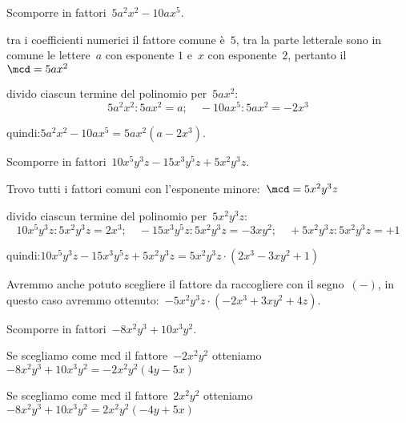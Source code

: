  \begin{esempio}
Scomporre in fattori~\(5a^{2}x^{2}-10ax^{5}\).
  \begin{enumeratea}
  \item tra i coefficienti numerici il fattore comune è~\(5\), 
   tra la parte letterale sono in comune le lettere~\(a\) con esponente \(1\) 
   e~\(x\) con esponente~\(2\), pertanto il~\(\mcd=5ax^{2}\)
 \item divido ciascun termine del polinomio per~\(5ax^{2}\):
 \[5a^{2}x^{2}:5ax^{2}=a; \quad -10ax^{5}:5ax^{2}=-2x^{3}\]
  \item quindi:\quad \(5a^{2}x^{2}-10ax^{5}=5ax^{2}(a-2x^{3})\).
  \end{enumeratea}
 \end{esempio}

 \begin{esempio}
Scomporre in fattori~\(10x^{5}y^{3}z-15x^{3}y^{5}z+5x^{2}y^{3}z\).
 \begin{enumeratea}
 \item Trovo tutti i fattori comuni con l'esponente 
minore:~\(\mcd=5x^{2}y^{3}z\)
 \item divido ciascun termine del polinomio per~\(5x^{2}y^{3}z\):
\[10x^{5}y^{3}z:5x^{2}y^{3}z=2x^{3}; \quad
-15x^{3}y^{5}z:5x^{2}y^{3}z=-3xy^{2}; \quad
+5x^{2}y^{3}z:5x^{2}y^{3}z=+1\]
 \item quindi:\quad \(10x^{5}y^{3}z-15x^{3}y^{5}z+5x^{2}y^{3}z =
 5x^{2}y^{3}z \cdot (2x^{3}-3xy^{2}+1)\)
 \end{enumeratea}
 \end{esempio}

 
\osservazione Avremmo anche potuto scegliere il fattore da raccogliere 
 con il segno~\((-)\), in questo caso avremmo 
 ottenuto:~\(-5x^{2}y^{3}z\cdot (-2x^{3}+3xy^{2}+4z)\).
 
 \begin{esempio}
Scomporre in fattori~\(-8x^{2}y^{3}+10x^{3}y^{2}\).
 \begin{enumerate*}
 \item  Se scegliamo come mcd il fattore~\(-2x^{2}y^{2}\)
  otteniamo~\(-8x^{2}y^{3}+10x^{3}y^{2}=-2x^{2}y^{2}(4y-5x)\)
 \item Se scegliamo come mcd il fattore~\(2x^{2}y^{2}\)
  otteniamo~\(-8x^{2}y^{3}+10x^{3}y^{2}=2x^{2}y^{2}(-4y+5x)\)
 \end{enumerate*}
 \end{esempio}

